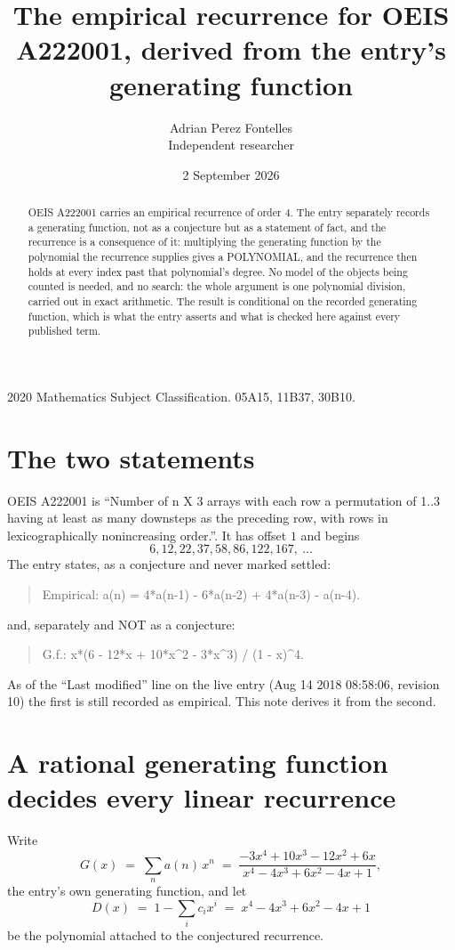\documentclass[11pt,a4paper]{article}
\title{The empirical recurrence for OEIS A222001, derived from the entry's generating function}
\author{Adrian Perez Fontelles\\ \small Independent researcher}
\date{2 September 2026}
\theoremstyle{plain}
\theoremstyle{definition}
\begin{document}
\maketitle

\begin{abstract}
OEIS A222001 carries an empirical recurrence of order $4$. The entry separately records a
generating function, not as a conjecture but as a statement of fact, and the recurrence is a
consequence of it: multiplying the generating function by the polynomial the recurrence
supplies gives a POLYNOMIAL, and the recurrence then holds at every index past that
polynomial's degree. No model of the objects being counted is needed, and no search: the
whole argument is one polynomial division, carried out in exact arithmetic. The result is
conditional on the recorded generating function, which is what the entry asserts and what is
checked here against every published term.
\end{abstract}

\noindent\small 2020 Mathematics Subject Classification. 05A15, 11B37, 30B10.\normalsize

\section{The two statements}

OEIS A222001 is ``Number of n X 3 arrays with each row a permutation of 1..3 having at least as many downsteps as the preceding row, with rows in lexicographically nonincreasing order.''. It has offset $1$ and begins
\[
6, 12, 22, 37, 58, 86, 122, 167,\ \dots
\]
The entry states, as a conjecture and never marked settled:
\begin{quote}
Empirical: a(n) = 4*a(n-1) - 6*a(n-2) + 4*a(n-3) - a(n-4).
\end{quote}
and, separately and NOT as a conjecture:
\begin{quote}
G.f.: x*(6 - 12*x + 10*x\^{}2 - 3*x\^{}3) / (1 - x)\^{}4.
\end{quote}
As of the ``Last modified'' line on the live entry (Aug 14 2018 08:58:06, revision 10) the first is still
recorded as empirical. This note derives it from the second.

\section{A rational generating function decides every linear recurrence}

Write
\[
G(x)\;=\;\sum_{n}a(n)\,x^{n}\;=\;\frac{- 3 x^{4} + 10 x^{3} - 12 x^{2} + 6 x}{x^{4} - 4 x^{3} + 6 x^{2} - 4 x + 1},
\]
the entry's own generating function, and let
\[
D(x)\;=\;1-\sum_i c_i x^{i}\;=\;x^{4} - 4 x^{3} + 6 x^{2} - 4 x + 1
\]
be the polynomial attached to the conjectured recurrence.
\end{document}
